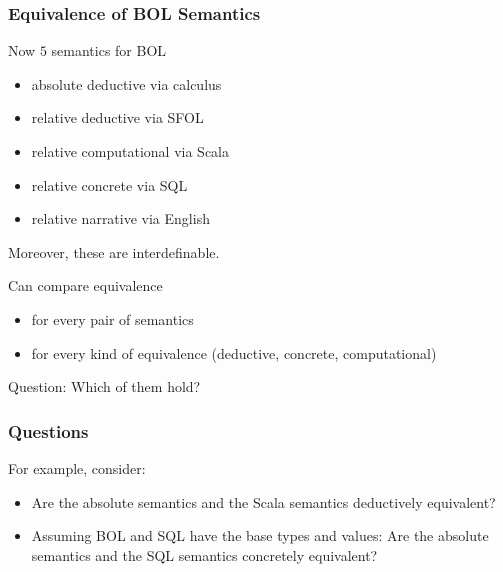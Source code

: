 \begin{frame}\frametitle{Equivalence of BOL Semantics}
Now $5$ semantics for BOL
\begin{itemize}
\item absolute deductive via calculus
\item relative deductive via SFOL
\item relative computational via Scala
\item relative concrete via SQL
\item relative narrative via English
\end{itemize}
Moreover, these are interdefinable.

Can compare equivalence
\begin{itemize}
\item for every pair of semantics
\item for every kind of equivalence (deductive, concrete, computational)
\end{itemize}
Question: Which of them hold?
\end{frame}

\begin{frame}\frametitle{Questions}
For example, consider:
\begin{itemize}
\item Are the absolute semantics and the Scala semantics deductively equivalent?
\item Assuming BOL and SQL have the base types and values:
Are the absolute semantics and the SQL semantics concretely equivalent?
\end{itemize}
\end{frame}

